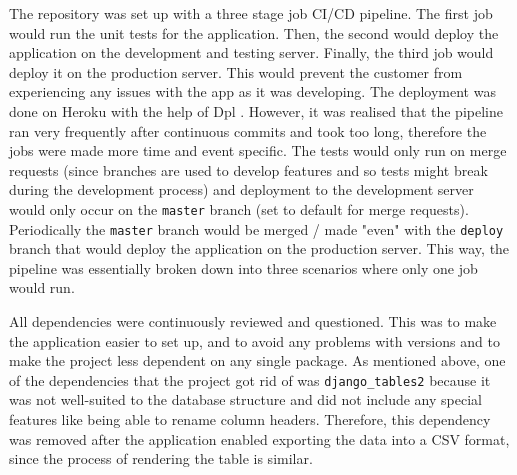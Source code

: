\documentclass{l3proj}
\begin{document}
The repository was set up with a three stage job CI/CD pipeline. The first job would run the unit tests for the application. Then, the second would deploy the application on the development and testing server. Finally, the third job would deploy it on the production server. This would prevent the customer from experiencing any issues with the app as it was developing. 
The deployment was done on Heroku with the help of Dpl \cite{gitlabdpl}. However, it was realised that the pipeline ran very frequently after continuous commits and took too long, therefore the jobs were made more time and event specific. The tests would only run on merge requests (since branches are used to develop features and so tests might break during the development process) and deployment to the development server would only occur on the \texttt{master} branch (set to default for merge requests). Periodically the \texttt{master} branch would be merged / made "even" with the \texttt{deploy} branch that would deploy the application on the production server. This way, the pipeline was essentially broken down into three scenarios where only one job would run.

All dependencies were continuously reviewed and questioned. This was to make the application easier to set up, and to avoid any problems with versions and to make the project less dependent on any single package.
As mentioned above, one of the dependencies that the project got rid of was \texttt{django\_tables2} because it was not well-suited to the database structure and did not include any special features like being able to rename column headers. Therefore, this dependency was removed after the application enabled exporting the data into a CSV format, since the process of rendering the table is similar. 
\end{document}
